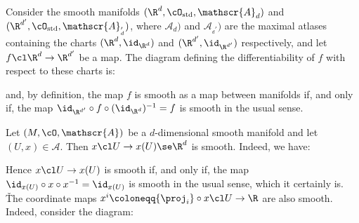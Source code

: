 \be
Consider the smooth manifolds $(\R^d,\cO_\mathrm{std}, \mathscr{A}_d)$ and $(\R^{d'},\cO_\mathrm{std},
\mathscr{A}_{_d'})$, where $\mathscr{A}_d)$ and $\mathscr{A}_{_d'})$ are the maximal atlases containing the charts $
(\R^d,\id_{\R^d})$ and $(\R^{d'},\id_{\R^{d'}})$ respectively, and let $f\cl \R^{d}\to \R^{d'}$ be a map. The diagram
defining the differentiability of $f$ with respect to these charts is:

\vspace{12pt}

\bse
{}
\ese

\vspace{12pt}

and, by definition, the map $f$ is smooth as a map between manifolds if, and only if, the map $\id_{\R^{d'}}\circ
f\circ (\id_{\R^d})^{-1}=f$ is smooth in the usual sense.
\ee

\be
Let $(M,\cO,\mathscr{A})$ be a $d$-dimensional smooth manifold and let $(U,x)\in\mathscr{A}$. Then $x\cl U \to x(U)
\se \R^d$ is smooth. Indeed, we have:

\vspace{12pt}

\bse
{}
\ese

\vspace{12pt}

Hence $x\cl U \to x(U)$ is smooth if, and only if, the map $\id_{x(U)}\circ x\circ x^{-1}=\id_{x(U)}$ is smooth in
the usual sense, which it certainly is. \v

The coordinate maps $x^i \coloneqq {\proj_i}\circ x\cl U \to \R$ are also smooth. Indeed, consider the diagram:

\vspace{12pt}

\bse
{}
\ese

